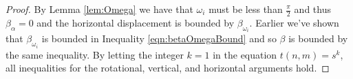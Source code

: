 \documentclass[10pt]{CSUNthesis}
\theoremstyle{plain}%
\theoremstyle{definition}
\theoremstyle{remark}
\newcommand{\ith}{i^\text{th}}
\newcommand{\lr}[1]{\left( #1 \right)}
\newcommand{\vlr}[1]{\left\vert #1 \right\vert}
\begin{document}
\begin{proof}
By Lemma \ref{lem:Omega} we have that $\omega_i$ must be less than $\frac{\pi}{2}$ and thus $\beta_\alpha = 0$ and the horizontal displacement is bounded by $\beta_{\omega_i}$.    
Earlier we've shown that $\beta_{\omega_i}$ is bounded in Inequality \ref{eqn:betaOmegaBound} and so $\beta$ is bounded by the same inequality.  
By letting the integer $k=1$ in the equation $t(n,m)=s^k$, all inequalities for the rotational, vertical, and horizontal arguments hold.












\end{proof}
\end{document}
